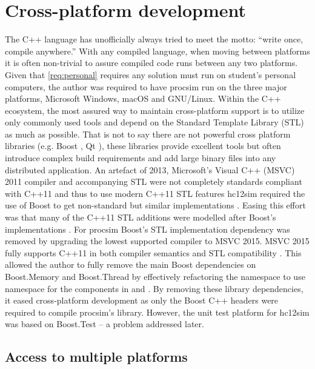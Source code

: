 \section{Cross-platform development}
\label{sec:cross-platform:sec:cross-platform-development}

The C++ language has unofficially always tried to meet the motto: ``write once, compile anywhere.'' With any compiled language, when moving between platforms it is often non-trivial to assure compiled code runs between any two platforms. Given that \cref{req:personal} requires any solution must run on student's personal computers, the author was required to have procsim run on the three major platforms, Microsoft Windows, macOS and GNU/Linux. Within the C++ ecosystem, the most assured way to maintain cross-platform support is to utilize only commonly used tools and depend on the Standard Template Library (STL) as much as possible. That is not to say there are not powerful cross platform libraries (e.g. Boost \cite{Boost}, Qt \cite{Qt}), these libraries provide excellent tools but often introduce complex build requirements and add large binary files into any distributed application. An artefact of 2013, Microsoft's Visual C++ (MSVC) 2011 compiler and accompanying STL were not completely standards compliant with C++11 and thus to use modern C++11 STL features hc12sim required the use of Boost to get non-standard but similar implementations \cite{Microsoft:MSVC:ModernCPP:2011}. Easing this effort was that many of the C++11 STL additions were modelled after Boost's implementations \cite{Meyers2005}. For procsim Boost's STL implementation dependency was removed by upgrading the lowest supported compiler to MSVC 2015. MSVC 2015 fully supports C++11 in both compiler semantics and STL compatibility \cite{Microsoft:MSVC:ModernCPP}. This allowed the author to fully remove the main Boost dependencies on Boost.Memory and Boost.Thread by effectively refactoring the  namespace to use  namespace for the components in  and . By removing these library dependencies, it eased cross-platform development as only the Boost C++ headers were required to compile procsim's library. However, the unit test platform for hc12sim was based on Boost.Test \cite{Boost1.53.0:Test} -- a problem addressed later.

\subsection{Access to multiple platforms}


